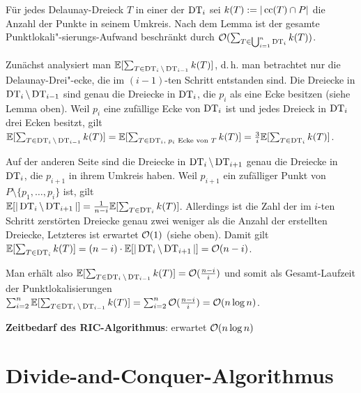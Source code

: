 \begin{Beweis}
    Für jedes Delaunay-Dreieck $T$ in einer der $\operatorname{DT}_i$ sei
    $k(T) := |\operatorname{cc}(T) \cap P|$ die Anzahl der Punkte in seinem Umkreis.
    Nach dem Lemma ist der gesamte  Punktlokali"-sierungs-Aufwand beschränkt durch
    $\mathcal{O}(\sum_{T \in \bigcup_{i=1}^n \operatorname{DT}_i} k(T))$.

    Zunächst analysiert man $\mathbb{E}[\sum_{T \in \operatorname{DT}_i \setminus \operatorname{DT}_{i-1}} k(T)]$,
    d.\,h. man betrachtet nur die Delaunay-Drei"-ecke, die im $(i-1)$-ten Schritt entstanden sind.
    Die Dreiecke in $\operatorname{DT}_i \setminus \operatorname{DT}_{i-1}$ sind genau die Dreiecke
    in $\operatorname{DT}_i$, die $p_i$ als eine Ecke besitzen (siehe Lemma oben).
    Weil $p_i$ eine
    zufällige Ecke von $\operatorname{DT}_i$ ist und jedes Dreieck in $\operatorname{DT}_i$ drei Ecken besitzt, gilt\\
    $\mathbb{E}[\sum_{T \in \operatorname{DT}_i \setminus \operatorname{DT}_{i-1}} k(T)]
    = \mathbb{E}[\sum_{T \in \operatorname{DT}_i,\; \text{$p_i$ Ecke von $T$}} k(T)]
    = \frac{3}{i} \mathbb{E}[\sum_{T \in \operatorname{DT}_i} k(T)]$.

    Auf der anderen Seite sind die Dreiecke in $\operatorname{DT}_i \setminus \operatorname{DT}_{i+1}$ genau die Dreiecke
    in $\operatorname{DT}_i$, die $p_{i+1}$ in ihrem Umkreis haben.
    Weil $p_{i+1}$ ein zufälliger Punkt von $P \setminus \{p_1, \dotsc, p_i\}$ ist, gilt\\
    $\mathbb{E}[|\operatorname{DT}_i \setminus \operatorname{DT}_{i+1}|] = \frac{1}{n-i} \mathbb{E}[\sum_{T \in \operatorname{DT}_i} k(T)]$.
    Allerdings ist die Zahl der im $i$-ten Schritt zerstörten Dreiecke genau zwei weniger als
    die Anzahl der erstellten Dreiecke, Letzteres ist erwartet $\mathcal{O}(1)$ (siehe oben).
    Damit gilt
    $\mathbb{E}[\sum_{T \in \operatorname{DT}_i} k(T)] = (n-i) \cdot \mathbb{E}[|\operatorname{DT}_i \setminus \operatorname{DT}_{i+1}|] = \mathcal{O}(n - i)$.

    Man erhält also $\mathbb{E}[\sum_{T \in \operatorname{DT}_i \setminus \operatorname{DT}_{i-1}} k(T)] = \mathcal{O}(\frac{n - i}{i})$ und
    somit als Gesamt-Laufzeit der Punktlokalisierungen
    $\sum_{i=2}^n \mathbb{E}[\sum_{T \in \operatorname{DT}_i \setminus \operatorname{DT}_{i-1}} k(T)] =
    \sum_{i=2}^n \mathcal{O}(\frac{n-i}{i}) = \mathcal{O}(n \log n)$.
\end{Beweis}

\linie

\textbf{Zeitbedarf des RIC-Algorithmus}:
erwartet $\mathcal{O}(n \log n)$

\pagebreak

\section{%
    Divide-and-Conquer-Algorithmus%
}

